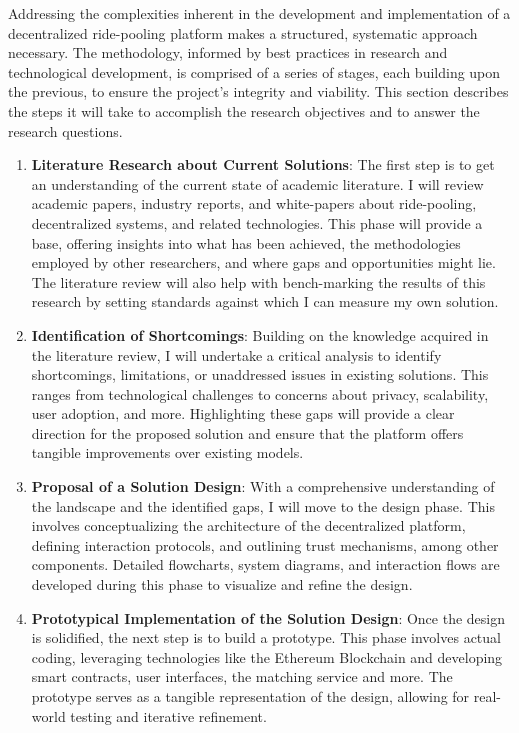 Addressing the complexities inherent in the development and implementation of a decentralized ride-pooling platform makes a structured, systematic approach necessary. The methodology, informed by best practices in research and technological development, is comprised of a series of stages, each building upon the previous, to ensure the project's integrity and viability. This section describes the steps it will take to accomplish the research objectives and to answer the research questions.

\begin{enumerate}
    \item \textbf{Literature Research about Current Solutions}: 
    The first step is to get an understanding of the current state of academic literature. I will review academic papers, industry reports, and white-papers about ride-pooling, decentralized systems, and related technologies. This phase will provide a base, offering insights into what has been achieved, the methodologies employed by other researchers, and where gaps and opportunities might lie. The literature review will also help with bench-marking the results of this research by setting standards against which I can measure my own solution.

    \item \textbf{Identification of Shortcomings}: 
    Building on the knowledge acquired in the literature review, I will undertake a critical analysis to identify shortcomings, limitations, or unaddressed issues in existing solutions. This ranges from technological challenges to concerns about privacy, scalability, user adoption, and more. Highlighting these gaps will provide a clear direction for the proposed solution and ensure that the platform offers tangible improvements over existing models.

    \item \textbf{Proposal of a Solution Design}:
    With a comprehensive understanding of the landscape and the identified gaps, I will move to the design phase. This involves conceptualizing the architecture of the decentralized platform, defining interaction protocols, and outlining trust mechanisms, among other components. Detailed flowcharts, system diagrams, and interaction flows are developed during this phase to visualize and refine the design.

    \item \textbf{Prototypical Implementation of the Solution Design}: 
    Once the design is solidified, the next step is to build a prototype. This phase involves actual coding, leveraging technologies like the Ethereum Blockchain and developing smart contracts, user interfaces, the matching service and more. The prototype serves as a tangible representation of the design, allowing for real-world testing and iterative refinement.


\end{enumerate}

